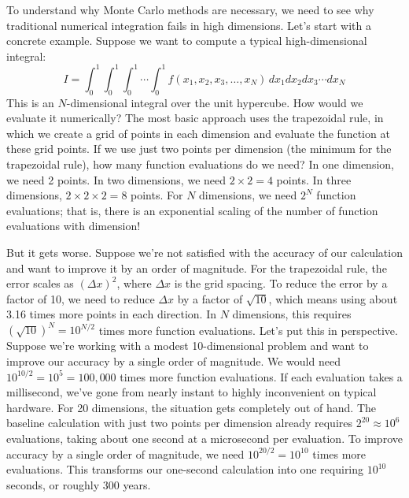 To understand why Monte Carlo methods are necessary, we need to see why traditional numerical integration fails in high dimensions. Let's start with a concrete example. Suppose we want to compute a typical high-dimensional integral:
\begin{equation}
    I = \int_0^1 \int_0^1 \int_0^1 \cdots \int_0^1 f(x_1, x_2, x_3, \ldots, x_N) \, dx_1 dx_2 dx_3 \cdots dx_N
\end{equation}
This is an $N$-dimensional integral over the unit hypercube. How would we evaluate it numerically? The most basic approach uses the trapezoidal rule, in which we create a grid of points in each dimension and evaluate the function at these grid points. If we use just two points per dimension (the minimum for the trapezoidal rule), how many function evaluations do we need? In one dimension, we need 2 points. In two dimensions, we need $2 \times 2 = 4$ points. In three dimensions, $2 \times 2 \times 2 = 8$ points. For $N$ dimensions, we need $2^N$ function evaluations; that is, there is an exponential scaling of the number of function evaluations with dimension!

But it gets worse. Suppose we're not satisfied with the accuracy of our calculation and want to improve it by an order of magnitude. For the trapezoidal rule, the error scales as $(\Delta x)^2$, where $\Delta x$ is the grid spacing. To reduce the error by a factor of 10, we need to reduce $\Delta x$ by a factor of $\sqrt{10}$, which means using about 3.16 times more points in each direction. In $N$ dimensions, this requires $(\sqrt{10})^N = 10^{N/2}$ times more function evaluations. Let's put this in perspective. Suppose we're working with a modest 10-dimensional problem and want to improve our accuracy by a single order of magnitude. We would need $10^{10/2} = 10^5 = 100{,}000$ times more function evaluations. If each evaluation takes a millisecond, we've gone from nearly instant to highly inconvenient on typical hardware. For 20 dimensions, the situation gets completely out of hand. The baseline calculation with just two points per dimension already requires $2^{20} \approx 10^6$ evaluations, taking about one second at a microsecond per evaluation. To improve accuracy by a single order of magnitude, we need $10^{20/2} = 10^{10}$ times more evaluations. This transforms our one-second calculation into one requiring $10^{10}$ seconds, or roughly 300 years.

